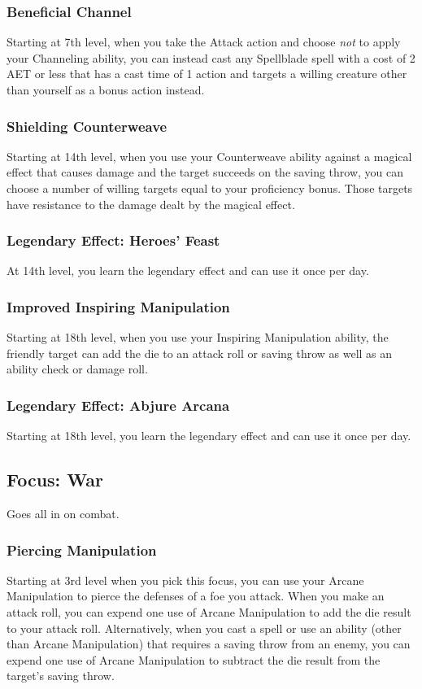 \subsubsection{Beneficial Channel}
Starting at 7th level, when you take the Attack action and choose \textit{not} to apply your Channeling ability, you can instead cast any Spellblade spell with a cost of 2 AET or less that has a cast time of 1 action and targets a willing creature other than yourself as a bonus action instead.

\subsubsection{Shielding Counterweave}
Starting at 14th level, when you use your Counterweave ability against a magical effect that causes damage and the target succeeds on the saving throw, you can choose a number of willing targets equal to your proficiency bonus. Those targets have resistance to the damage dealt by the magical effect.

\subsubsection{Legendary Effect: Heroes' Feast}
At 14th level, you learn the legendary effect  and can use it once per day.

\subsubsection{Improved Inspiring Manipulation}
Starting at 18th level, when you use your Inspiring Manipulation ability, the friendly target can add the die to an attack roll or saving throw as well as an ability check or damage roll.

\subsubsection{Legendary Effect: Abjure Arcana}
Starting at 18th level, you learn the legendary effect  and can use it once per day.

\subsection{Focus: War}
Goes all in on combat.
\subsubsection{Piercing Manipulation}
Starting at 3rd level when you pick this focus, you can use your Arcane Manipulation to pierce the defenses of a foe you attack. When you make an attack roll, you can expend one use of Arcane Manipulation to add the die result to your attack roll. Alternatively, when you cast a spell or use an ability (other than Arcane Manipulation) that requires a saving throw from an enemy, you can expend one use of Arcane Manipulation to subtract the die result from the target's saving throw.

